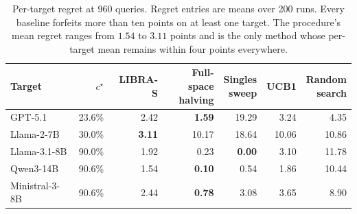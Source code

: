 \begin{table}[!t]
\centering
\caption{Per-target regret at 960 queries. Regret entries are means over 200 runs. Every baseline forfeits more than ten points on at least one target. The procedure's mean regret ranges from $1.54$ to $3.11$ points and is the only method whose per-target mean remains within four points everywhere.}
\label{tab:regret_perfold}
\footnotesize
\setlength{\tabcolsep}{3pt}
\begin{tabular}{@{}l r r r r r r@{}}
\toprule
Target & $c^{\star}$ & LIBRA-S & \makecell{Full-space\\halving} & \makecell{Singles\\sweep} & UCB1 & \makecell{Random\\search} \\
\midrule
GPT-5.1         & 23.6\% & 2.42 & \textbf{1.59} & 19.29 & 3.24 & 4.35 \\
Llama-2-7B      & 30.0\% & \textbf{3.11} & 10.17 & 18.64 & 10.06 & 10.86 \\
Llama-3.1-8B    & 90.0\% & 1.92 & 0.23 & \textbf{0.00} & 3.10 & 11.78 \\
Qwen3-14B       & 90.6\% & 1.54 & \textbf{0.10} & 0.54 & 1.86 & 10.44 \\
Ministral-3-8B  & 90.6\% & 2.44 & \textbf{0.78} & 3.08 & 3.65 & 8.90 \\
\bottomrule
\end{tabular}
\end{table}
